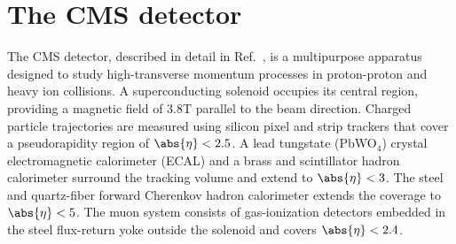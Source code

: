 %
%
%

\section{The CMS detector}

The CMS detector, described in detail in Ref.~\cite{CMSdetector}, is a multipurpose apparatus designed to study high-transverse momentum  processes in proton-proton and heavy ion collisions.
%                                                                                                                                                                                                    
A superconducting solenoid occupies its central region, providing a magnetic field of 3.8\unit{T} parallel to the beam direction.
%                                                                                                                                                                                                    
Charged particle trajectories are measured using silicon pixel and strip trackers that cover a pseudorapidity region of $\abs{\eta} < 2.5$.
%                                                                                                                                                                                                    
A lead tungstate (PbWO$_4$) crystal electromagnetic calorimeter (ECAL) and a brass and scintillator hadron calorimeter  surround the tracking volume and extend to $\abs{\eta} < 3$.
%                                                                                                                                                                                                    
The steel and quartz-fiber forward Cherenkov hadron calorimeter extends the coverage to $\abs{\eta} < 5$.
%                                                                                                                                                                                                    
The muon system consists of gas-ionization detectors embedded in the steel flux-return yoke outside the solenoid and covers $\abs{\eta} < 2.4$.
